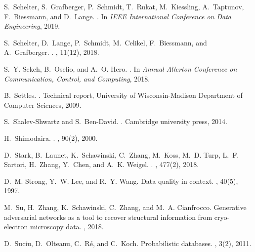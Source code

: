 \documentclass[11pt]{article}
\begin{document}
\begin{thebibliography}{10}
S.~Schelter, S.~Grafberger, P.~Schmidt, T.~Rukat, M.~Kiessling, A.~Taptunov,
  F.~Biessmann, and D.~Lange.
.
\newblock In {\em IEEE International Conference on Data Engineering}, 2019.

S.~Schelter, D.~Lange, P.~Schmidt, M.~Celikel, F.~Biessmann, and A.~Grafberger.
.
, 11(12), 2018.

S.~Y. Sekeh, B.~Oselio, and A.~O. Hero.
.
\newblock In {\em Annual Allerton Conference on Communication, Control, and
  Computing}, 2018.

B.~Settles.
.
\newblock Technical report, University of Wisconsin-Madison Department of
  Computer Sciences, 2009.

S.~Shalev-Shwartz and S.~Ben-David.
.
\newblock Cambridge university press, 2014.

H.~Shimodaira.
.
, 90(2), 2000.

D.~Stark, B.~Launet, K.~Schawinski, C.~Zhang, M.~Koss, M.~D. Turp, L.~F.
  Sartori, H.~Zhang, Y.~Chen, and A.~K. Weigel.
.
, 477(2),
  2018.

D.~M. Strong, Y.~W. Lee, and R.~Y. Wang.
\newblock Data quality in context.
, 40(5), 1997.

M.~Su, H.~Zhang, K.~Schawinski, C.~Zhang, and M.~A. Cianfrocco.
\newblock Generative adversarial networks as a tool to recover structural
  information from cryo-electron microscopy data.
, 2018.

D.~Suciu, D.~Olteanu, C.~R{\'e}, and C.~Koch.
\newblock Probabilistic databases.
, 3(2), 2011.


\end{thebibliography}
\end{document}
